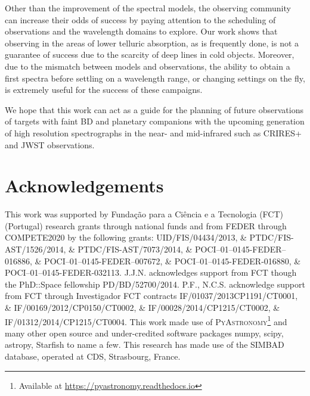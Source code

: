 \documentclass[fleqn,usenatbib]{mnras}
\begin{document}
Other than the improvement of the spectral models, the observing community can increase their odds of success by paying attention to the scheduling of observations and the wavelength domains to explore. Our work shows that observing in the areas of lower telluric absorption, as is frequently done, is not a guarantee of success due to the scarcity of deep lines in cold objects. Moreover, due to the mismatch between models and observations, the ability to obtain a first spectra before settling on a wavelength range, or changing settings on the fly, is extremely useful for the success of these campaigns.

We hope that this work can act as a guide for the planning of future observations of targets with faint BD and planetary companions with the upcoming generation of high resolution spectrographs in the near- and mid-infrared such as CRIRES+ and JWST observations.


\section*{Acknowledgements}
This work was supported by Funda\c{c}\~ao para a Ci\^encia e a Tecnologia (FCT) (Portugal) research grants through national funds and from FEDER through COMPETE2020 by the following grants: UID/FIS/04434/2013, \&  PTDC/FIS-AST/1526/2014, \& PTDC/FIS-AST/7073/2014, \& POCI--01--0145-FEDER--016886, \& POCI--01--0145-FEDER--007672, \& POCI--01--0145-FEDER-016880, \& POCI--01--0145-FEDER-032113.
J.J.N. acknowledges support from FCT though the PhD::Space fellowship PD/BD/52700/2014.
P.F., N.C.S. acknowledge support from FCT through Investigador FCT contracts IF/01037/2013CP1191/CT0001, \& IF/00169/2012/CP0150/CT0002, \& IF/00028/2014/CP1215/CT0002, \& IF/01312/2014/CP1215/CT0004.
This work made use of \textsc{PyAstronomy}\footnote{Available at \href{https://pyastronomy.readthedocs.io}{https://pyastronomy.readthedocs.io}} and many other open source and under-credited software packages numpy, scipy, astropy, Starfish to name a few.
This research has made use of the SIMBAD database, operated at CDS, Strasbourg, France.




\appendix
\end{document}
